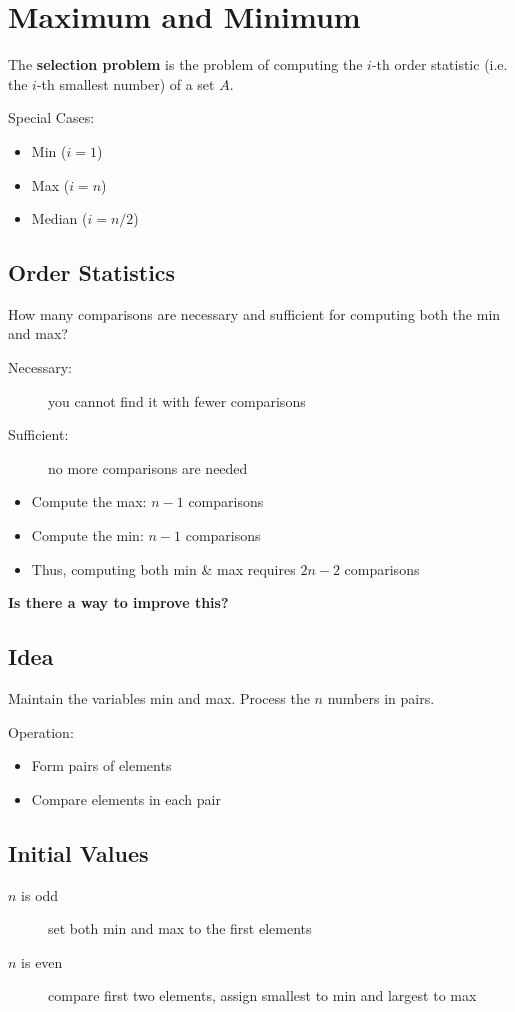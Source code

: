 \documentclass{article}
\begin{document}
\section*{Maximum and Minimum}
The \textbf{selection problem} is the problem of computing the $i$-th order
statistic (i.e. the $i$-th smallest number) of a set $A$.

Special Cases:
\begin{itemize}
    \item Min ($i = 1$)
    \item Max ($i = n$)
    \item Median ($i = n/2$)
\end{itemize}

\subsection*{Order Statistics}
How many comparisons are necessary and sufficient for computing both the min and max?

\begin{description}
    \item[Necessary:] you cannot find it with fewer comparisons
    \item[Sufficient:] no more comparisons are needed
\end{description}

\begin{itemize}
    \item Compute the max: $n - 1$ comparisons
    \item Compute the min: $n - 1$ comparisons
    \item Thus, computing both min \& max requires $2n - 2$ comparisons
\end{itemize}

\textbf{Is there a way to improve this?}

\subsection*{Idea}
Maintain the variables min and max. Process the $n$ numbers in pairs.

Operation:
\begin{itemize}
    \item Form pairs of elements
    \item Compare elements in each pair
\end{itemize}

\subsection*{Initial Values}
\begin{description}
    \item[$n$ is odd] set both min and max to the first elements
    \item[$n$ is even] compare first two elements, assign smallest to min and largest to max
\end{description}
\end{document}
